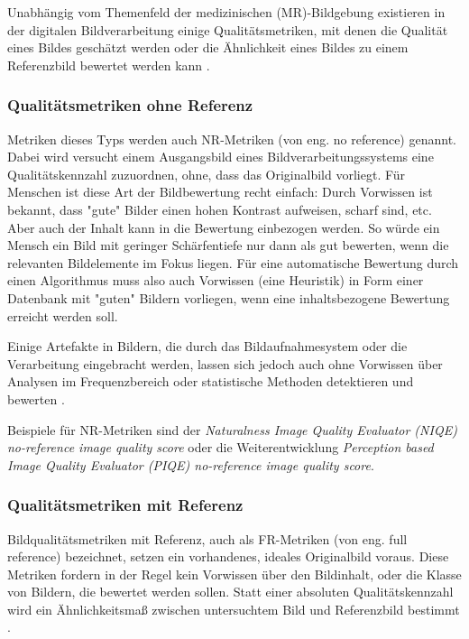 Unabhängig vom Themenfeld der medizinischen (MR)-Bildgebung existieren in der digitalen Bildverarbeitung einige Qualitätsmetriken, mit denen die Qualität eines Bildes geschätzt werden oder die Ähnlichkeit eines Bildes zu einem Referenzbild bewertet werden kann \cite{Wang2006}.

\subsubsection{Qualitätsmetriken ohne Referenz}
Metriken dieses Typs werden auch NR-Metriken (von eng. no reference) genannt. Dabei wird versucht einem Ausgangsbild eines Bildverarbeitungssystems eine Qualitätskennzahl zuzuordnen, ohne, dass das Originalbild vorliegt. Für Menschen ist diese Art der Bildbewertung recht einfach: Durch Vorwissen ist bekannt, dass "gute" Bilder einen hohen Kontrast aufweisen, scharf sind, etc. Aber auch der Inhalt kann in die Bewertung einbezogen werden. So würde ein Mensch ein Bild mit geringer Schärfentiefe nur dann als gut bewerten, wenn die relevanten Bildelemente im Fokus liegen. Für eine automatische Bewertung durch einen Algorithmus muss also auch Vorwissen (eine Heuristik) in Form einer Datenbank mit "guten" Bildern vorliegen, wenn eine inhaltsbezogene Bewertung erreicht werden soll.

Einige Artefakte in Bildern, die durch das Bildaufnahmesystem oder die Verarbeitung eingebracht werden, lassen sich jedoch auch ohne Vorwissen über Analysen im Frequenzbereich oder statistische Methoden detektieren und bewerten \cite[S.~86]{Wang2006}.

Beispiele für NR-Metriken sind der \textit{Naturalness Image Quality Evaluator (NIQE) no-reference image quality score}\cite{Mittal2013} oder die Weiterentwicklung \textit{Perception based Image Quality Evaluator (PIQE) no-reference image quality score}\cite{Venkatanath2015}.

\subsubsection{Qualitätsmetriken mit Referenz}
Bildqualitätsmetriken mit Referenz, auch als FR-Metriken (von eng. full reference) bezeichnet, setzen ein vorhandenes, ideales Originalbild voraus. Diese Metriken fordern in der Regel kein Vorwissen über den Bildinhalt, oder die Klasse von Bildern, die bewertet werden sollen. Statt einer absoluten Qualitätskennzahl wird ein Ähnlichkeitsmaß zwischen untersuchtem Bild und Referenzbild bestimmt \cite[S.~43]{Wang2006}.

